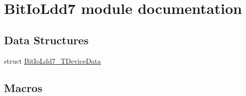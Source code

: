 \hypertarget{group___bit_io_ldd7__module}{}\section{Bit\+Io\+Ldd7 module documentation}
\label{group___bit_io_ldd7__module}
\subsection*{Data Structures}
\begin{DoxyCompactItemize}
\item 
struct \hyperlink{struct_bit_io_ldd7___t_device_data}{Bit\+Io\+Ldd7\+\_\+\+T\+Device\+Data}
\end{DoxyCompactItemize}
\subsection*{Macros}
